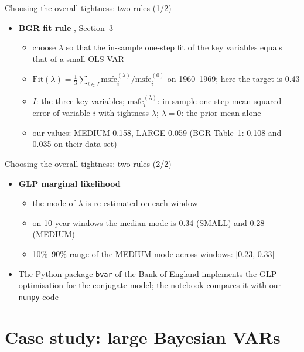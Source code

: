 \begin{frame}{Choosing the overall tightness: two rules (1/2)}
\itemsize{\small}
\begin{itemize}
    \item \textbf{BGR fit rule} , Section~3
    \begin{itemize}
        \item choose $\lambda$ so that the in-sample one-step fit of the key variables equals that of a small OLS VAR
        \item $\mathrm{Fit}(\lambda) = \frac13\sum_{i\in I}\mathrm{msfe}_i^{(\lambda)}/\mathrm{msfe}_i^{(0)}$ on 1960--1969; here the target is 0.43
        \item $I$: the three key variables; $\mathrm{msfe}_i^{(\lambda)}$: in-sample one-step mean squared error of variable $i$ with tightness $\lambda$; $\lambda = 0$: the prior mean alone
        \item our values: MEDIUM 0.158, LARGE 0.059 (BGR Table~1: 0.108 and 0.035 on their data set)
    \end{itemize}
\end{itemize}
\end{frame}

\begin{frame}{Choosing the overall tightness: two rules (2/2)}
\itemsize{\small}
\begin{itemize}
    \item \textbf{GLP marginal likelihood} 
    \begin{itemize}
        \item the mode of $\lambda$ is re-estimated on each window
        \item on 10-year windows the median mode is 0.34 (SMALL) and 0.28 (MEDIUM)
        \item 10\%--90\% range of the MEDIUM mode across windows: [0.23, 0.33]
    \end{itemize}
    \item The Python package \texttt{bvar} of the Bank of England implements the GLP optimisation for the conjugate model; the notebook compares it with our \texttt{numpy} code
\end{itemize}
\end{frame}


\section{Case study: large Bayesian VARs}

